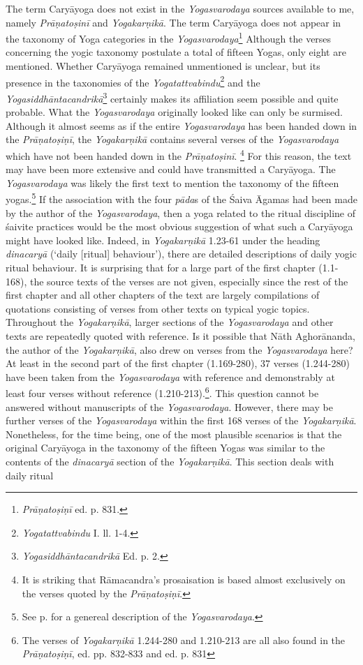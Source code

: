 The term Caryāyoga does not exist in the \textit{Yogasvarodaya} sources available to me, namely \textit{Prāṇatoṣinī} and \textit{Yogakarṇikā}. The term Caryāyoga does not appear in the taxonomy of Yoga categories in the \textit{Yogasvarodaya}\footnote{\textit{Prāṇatoṣiṇī} ed. p. 831.} Although the verses concerning the yogic taxonomy postulate a total of fifteen Yogas, only eight are mentioned. Whether Caryāyoga remained unmentioned is unclear, but its presence in the taxonomies of the \textit{Yogatattvabindu}\footnote{\textit{Yogatattvabindu} I. ll. 1-4.} and the \textit{Yogasiddhāntacandrikā}\footnote{\textit{Yogasiddhāntacandrikā} Ed. p. 2.} certainly makes its affiliation seem possible and quite probable. What the \textit{Yogasvarodaya} originally looked like can only be surmised. Although it almost seems as if the entire \textit{Yogasvarodaya} has been handed down in the \textit{Prāṇatoṣiṇī}, the \textit{Yogakarṇikā} contains several verses of the \textit{Yogasvarodaya} which have not been handed down in the \textit{Prāṇatoṣinī}. \footnote{It is striking that Rāmacandra's prosaisation is based almost exclusively on the verses quoted by the \textit{Prāṇatoṣiṇī}.} For this reason, the text may have been more extensive and could have transmitted a Caryāyoga. The \textit{Yogasvarodaya} was likely the first text to mention the taxonomy of the fifteen yogas.\footnote{See p.\pageref{???} for a genereal description of the \textit{Yogasvarodaya}.} If the association with the four \textit{pāda}s of the Śaiva Āgamas had been made by the author of the \textit{Yogasvarodaya}, then a yoga related to the ritual discipline of śaivite practices would be the most obvious suggestion of what such a Caryāyoga might have looked like. Indeed, in \textit{Yogakarṇikā} 1.23-61 under the heading \textit{dinacaryā} (`daily [ritual] behaviour'), there are detailed descriptions of daily yogic ritual behaviour. It is surprising that for a large part of the first chapter (1.1-168), the source texts of the verses are not given, especially since the rest of the first chapter and all other chapters of the text are largely compilations of quotations consisting of verses from other texts on typical yogic topics. Throughout the \textit{Yogakarṇikā}, larger sections of the \textit{Yogasvarodaya} and other texts are repeatedly quoted with reference. Is it possible that Nāth Aghorānanda, the author of the \textit{Yogakarṇikā}, also drew on verses from the \textit{Yogasvarodaya} here? At least in the second part of the first chapter (1.169-280), 37 verses (1.244-280) have been taken from the \textit{Yogasvarodaya} with reference and demonstrably at least four verses without reference (1.210-213).\footnote{The verses of \textit{Yogakarṇikā} 1.244-280 and 1.210-213 are all also found in the \textit{Prāṇatoṣiṇī}, ed. pp. 832-833 and ed. p. 831}. This question cannot be answered without manuscripts of the \textit{Yogasvarodaya}. However, there may be further verses of the \textit{Yogasvarodaya} within the first 168 verses of the \textit{Yogakarṇikā}. Nonetheless, for the time being, one of the most plausible scenarios is that the original Caryāyoga in the taxonomy of the fifteen Yogas was similar to the contents of the \textit{dinacaryā} section of the \textit{Yogakarṇikā}. This section deals with daily ritual 